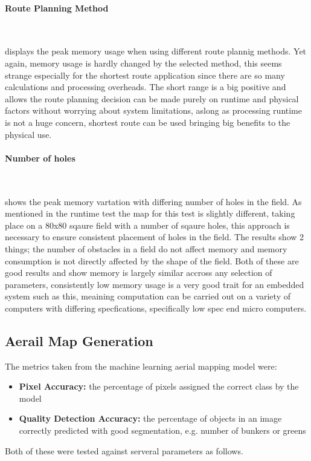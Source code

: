 \documentclass[final]{cmpreport_02}
\begin{document}
\paragraph{Route Planning Method} \

 displays the peak memory usage when using different route plannig methods. Yet again, memory usage is hardly changed by the selected method, this seems strange especially for the shortest route application since there are so many calculations and processing overheads.
The short range is a big positive and allows the route planning decision can be made purely on runtime and physical factors without worrying about system limitations, aslong as processing runtime is not a huge concern, shortest route can be used bringing big benefits to the physical use.



\paragraph{Number of holes} \

 shows the peak memory vartation with differing number of holes in the field.
As mentioned in the runtime test the map for this test is slightly different, taking place on a 80x80 sqaure field with a number of sqaure holes, this approach is necessary to ensure consistent placement of holes in the field.
The results show 2 things; the number of obstacles in a field do not affect memory and memory consumption is not directly affected by the shape of the field.
Both of these are good results and show memory is largely similar accross any selection of parameters, consistently low memory usage is a very good trait for an embedded system such as this, meaining computation can be carried out on a variety of computers with differing specfications, specifically low spec end micro computers.

\subsection{Aerail Map Generation}
The metrics taken from the machine learning aerial mapping model were:
\begin{itemize}
    \item{\textbf{Pixel Accuracy:} the percentage of pixels assigned the correct class by the model}
    \item{\textbf{Quality Detection Accuracy:} the percentage of objects in an image correctly predicted with good segmentation, e.g. number of bunkers or greens}
\end{itemize}
Both of these were tested against serveral parameters as follows.
\end{document}
